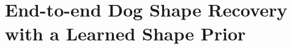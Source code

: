 \chapter{End-to-end Dog Shape Recovery with a Learned Shape Prior}\label{chap:wldo}

\ifpdf
    \graphicspath{{Chapter5/Figs/Raster/}{Chapter5/Figs/PDF/}{Chapter5/Figs/}}
\else
    \graphicspath{{Chapter5/Figs/Vector/}{Chapter5/Figs/}}
\fi






\newcommand\sfac{0.11}
\newcommand\sfacqual{0.18}
\newcommand\imgwidth{27mm}
\newcommand\imgwidthcomp{22mm}
\newcommand\labelwidthcomp{15mm}










